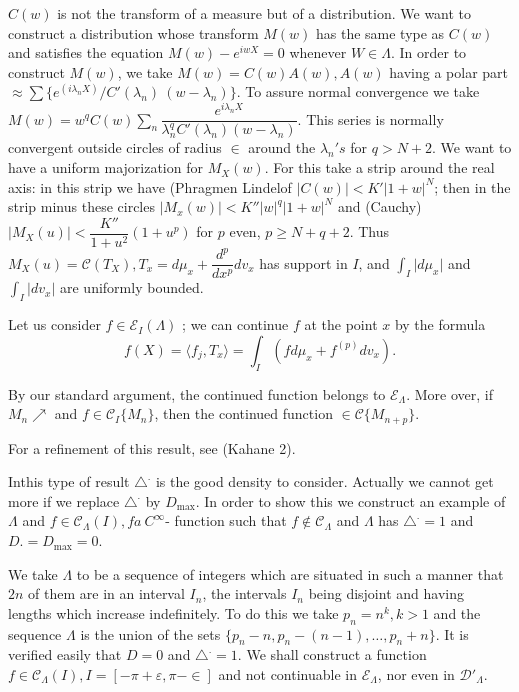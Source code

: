 $C(w)$ is not the transform of a measure but of a distribution. We
want to construct a distribution whose transform $M(w)$ has the same
type as $C(w)$ and satisfies the equation $M(w) - e^{iw X} = 0$
whenever $W \in \Lambda$. In order to construct $M(w)$, we take $M(w)
= C(w) A(w), A(w)$ having a polar part $\approx \sum \big \{ e^{( i
 \lambda_n X)}/ C'(\lambda_n)~(w-\lambda_n) \big\}$. To assure normal
convergence we take $M(w) = w^q C(w) \sum\limits_{n} \dfrac{e^{i
 \lambda_n X}} { \lambda^q_n C' (\lambda_n) (w- \lambda_n)}$. This
series is normally convergent outside circles of radius $\in $
around the $\lambda_n 's $ for $q > N + 2$. We want to have a uniform
majorization for $M_X (w)$. For this take a strip around the real
axis: in this strip we have (Phragmen Lindelof $\big | C(w) \big | <
K' | 1 + w |^N$; then in the strip minus these circles $\big | M_x
(w) \big | < K'' \big | w \big |^q \big | 1 + w \big|^N$ and (Cauchy)
$\big | M_X (u) \big | < \dfrac{K''}{1 + u^2} (1 + u^p)$ for $p$
even, $ p \ge N +q+2$. Thus $M_X (u) = \mathscr{C} (T_X), T_x = d
\mu_x + \dfrac{d^p}{dx^p} dv_x$ has support in $I$, and $\int_I \big |
d \mu_x \big |$ and $\int_{I} \big | dv_x \big |$ are uniformly
bounded. 

Let us consider $f \in \mathscr{E}_I (\Lambda)$ ; we can
continue $f$ at the point $x$ by the formula 
$$
f (X) = \langle f_j, T_x \rangle = \int_I (f d \mu_x + f^{(p)} dv_x).
$$

By our standard argument, the continued function belongs to
$\mathscr{E}_\Lambda$. More over, if $M_n \nearrow$ and $f \in
\mathscr{C}_I \{M_n\}$, then the continued function $\in \mathscr{C}
\big \{ M_{n + p}\big\}$. 

For a refinement of this result, see (Kahane 2).

In\pageoriginale this type of result $\triangle^.$ is the good density to
consider. Actually we cannot get more if we replace $\triangle^.$ by
$D_{\max}$. In order to show this we construct an example of $\Lambda$
and $f \in \mathscr{C}_\Lambda(I), f a ~ C^\infty$- function such that
$f \notin \mathscr{C}_\Lambda$ and $\Lambda$ has $\triangle^. = 1$ and
$D. = D_{\max} = 0$. 

We take $\Lambda$ to be a sequence of integers which are situated in
such a manner that $2n$ of them are in an interval $I_n$, the
intervals $I_n$ being disjoint and having lengths which increase
indefinitely. To do this we take $p_n = n^k, k> 1$ and the sequence
$\Lambda$ is the union of the sets $\big\{ p_n - n, p_n - (n - 1),
\ldots, p_n + n \big\}$. It is verified easily that $D = 0$ and
$\triangle^. = 1$. We shall construct a function $f \in
\mathscr{C}_\Lambda (I), I = [- \pi + \varepsilon, \pi - \in ]$
and not continuable in $\mathscr{E}_\Lambda$, nor even in
$\mathscr{D}'_\Lambda$. 

